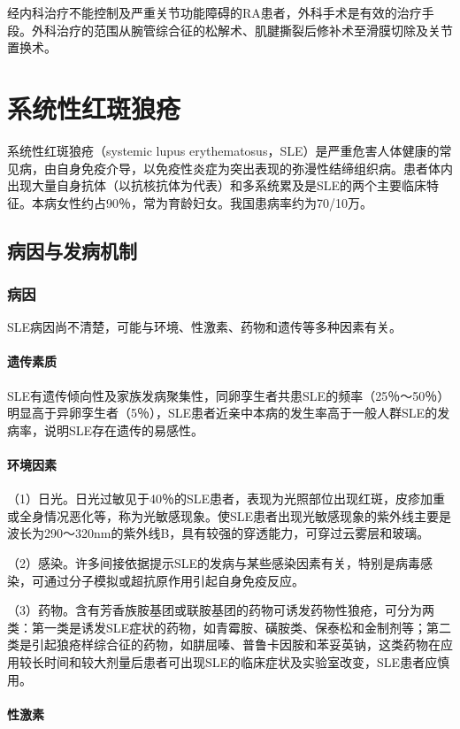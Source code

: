 经内科治疗不能控制及严重关节功能障碍的RA患者，外科手术是有效的治疗手段。外科治疗的范围从腕管综合征的松解术、肌腱撕裂后修补术至滑膜切除及关节置换术。

\section{系统性红斑狼疮}

系统性红斑狼疮（systemic lupus
erythematosus，SLE）是严重危害人体健康的常见病，由自身免疫介导，以免疫性炎症为突出表现的弥漫性结缔组织病。患者体内出现大量自身抗体（以抗核抗体为代表）和多系统累及是SLE的两个主要临床特征。本病女性约占90％，常为育龄妇女。我国患病率约为70/10万。

\subsection{病因与发病机制}

\subsubsection{病因}

SLE病因尚不清楚，可能与环境、性激素、药物和遗传等多种因素有关。
\paragraph{遗传素质}

SLE有遗传倾向性及家族发病聚集性，同卵孪生者共患SLE的频率（25％～50％）明显高于异卵孪生者（5％），SLE患者近亲中本病的发生率高于一般人群SLE的发病率，说明SLE存在遗传的易感性。
\paragraph{环境因素}

（1）日光。日光过敏见于40％的SLE患者，表现为光照部位出现红斑，皮疹加重或全身情况恶化等，称为光敏感现象。使SLE患者出现光敏感现象的紫外线主要是波长为290～320nm的紫外线B，具有较强的穿透能力，可穿过云雾层和玻璃。

（2）感染。许多间接依据提示SLE的发病与某些感染因素有关，特别是病毒感染，可通过分子模拟或超抗原作用引起自身免疫反应。

（3）药物。含有芳香族胺基团或联胺基团的药物可诱发药物性狼疮，可分为两类：第一类是诱发SLE症状的药物，如青霉胺、磺胺类、保泰松和金制剂等；第二类是引起狼疮样综合征的药物，如肼屈嗪、普鲁卡因胺和苯妥英钠，这类药物在应用较长时间和较大剂量后患者可出现SLE的临床症状及实验室改变，SLE患者应慎用。
\paragraph{性激素}

